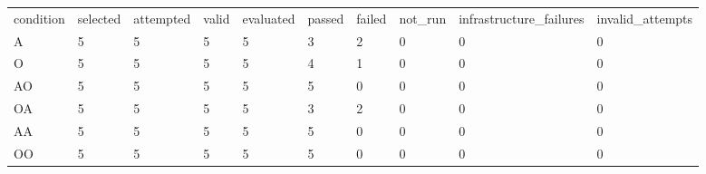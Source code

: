 \begin{tabular}{llllllllll}
condition & selected & attempted & valid & evaluated & passed & failed & not\_run & infrastructure\_failures & invalid\_attempts \\
A & 5 & 5 & 5 & 5 & 3 & 2 & 0 & 0 & 0 \\
O & 5 & 5 & 5 & 5 & 4 & 1 & 0 & 0 & 0 \\
AO & 5 & 5 & 5 & 5 & 5 & 0 & 0 & 0 & 0 \\
OA & 5 & 5 & 5 & 5 & 3 & 2 & 0 & 0 & 0 \\
AA & 5 & 5 & 5 & 5 & 5 & 0 & 0 & 0 & 0 \\
OO & 5 & 5 & 5 & 5 & 5 & 0 & 0 & 0 & 0 \\
\end{tabular}
